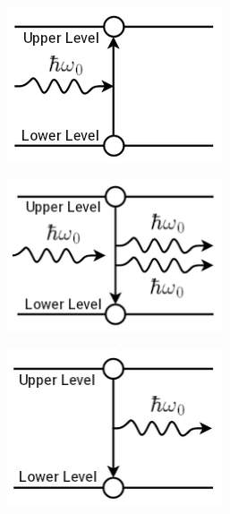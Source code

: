 \begin{figure}[H]
	\begin{subfigure}[t]{0.32\textwidth}
		\centering
		\includegraphics[width=0.7\textwidth]{USPSC-img/stimulated_absorption.png}
		\vspace{5pt}
		\label{img:stimulated-absorption}
	\end{subfigure}
	\hfill
	\begin{subfigure}[t]{0.32\textwidth}
		\centering
		\includegraphics[width=0.7\textwidth]{USPSC-img/stimulated_emission.png}
		\vspace{5pt}
		\label{img:stimulated-emission}
	\end{subfigure}
	\hfill
	\begin{subfigure}[t]{0.32\textwidth}
		\centering
		\includegraphics[width=0.7\textwidth]{USPSC-img/spontaneous_emission.png}

\end{subfigure}
\end{figure}
